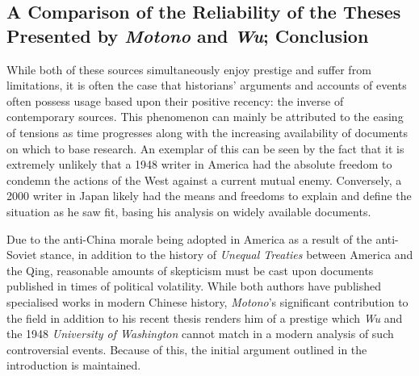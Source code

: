 \documentclass{article}
\begin{document}
\subsection{A Comparison of the Reliability of the Theses Presented by \textit{Motono} and \textit{Wu}; Conclusion}

        While both of these sources simultaneously enjoy prestige and suffer from limitations, it is often the case that historians' arguments and accounts of events often possess usage based upon their positive recency: the inverse of contemporary sources. This phenomenon can mainly be attributed to the easing of tensions as time progresses along with the increasing availability of documents on which to base research. An exemplar of this can be seen by the fact that it is extremely unlikely that a 1948 writer in America had the absolute freedom to condemn the actions of the West against a current mutual enemy. Conversely, a 2000 writer in Japan likely had the means and freedoms to explain and define the situation as he saw fit, basing his analysis on widely available documents.

        Due to the anti-China morale being adopted in America as a result of the anti-Soviet stance, in addition to the history of \textit{Unequal Treaties} between America and the Qing, reasonable amounts of skepticism must be cast upon documents published in times of political volatility. While both authors have published specialised works in modern Chinese history, \textit{Motono}'s significant contribution to the field in addition to his recent thesis renders him of a prestige which \textit{Wu} and the 1948 \textit{University of Washington} cannot match in a modern analysis of such controversial events. Because of this, the initial argument outlined in the introduction is maintained.

\pagebreak
\printbibliography[title={Cited Works}, heading=bibintoc]
\end{document}
